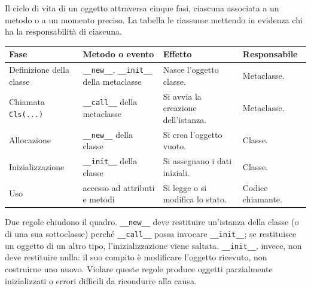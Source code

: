 \documentclass[12pt]{extarticle}
\begin{document}
\noindent Il ciclo di vita di un oggetto attraversa cinque fasi, ciascuna associata a un metodo o a un momento preciso. La tabella le riassume mettendo in evidenza chi ha la responsabilità di ciascuna.

\begin{center}
\small
\begin{tabular}{p{3.4cm}p{4.0cm}p{4.2cm}p{3.0cm}}
    \toprule
    \textbf{Fase} & \textbf{Metodo o evento} & \textbf{Effetto} & \textbf{Responsabile} \\
    \midrule
    Definizione della classe & \texttt{\_\_new\_\_}, \texttt{\_\_init\_\_} della metaclasse & Nasce l'oggetto classe. & Metaclasse. \\
    \addlinespace
    Chiamata \texttt{Cls(...)} & \texttt{\_\_call\_\_} della metaclasse & Si avvia la creazione dell'istanza. & Metaclasse. \\
    \addlinespace
    Allocazione & \texttt{\_\_new\_\_} della classe & Si crea l'oggetto vuoto. & Classe. \\
    \addlinespace
    Inizializzazione & \texttt{\_\_init\_\_} della classe & Si assegnano i dati iniziali. & Classe. \\
    \addlinespace
    Uso & accesso ad attributi e metodi & Si legge o si modifica lo stato. & Codice chiamante. \\
    \bottomrule
\end{tabular}
\end{center}

\noindent Due regole chiudono il quadro. \texttt{\_\_new\_\_} deve restituire un'istanza della classe (o di una sua sottoclasse) perché \texttt{\_\_call\_\_} possa invocare \texttt{\_\_init\_\_}; se restituisce un oggetto di un altro tipo, l'inizializzazione viene saltata. \texttt{\_\_init\_\_}, invece, non deve restituire nulla: il suo compito è modificare l'oggetto ricevuto, non costruirne uno nuovo. Violare queste regole produce oggetti parzialmente inizializzati o errori difficili da ricondurre alla causa.
\end{document}
